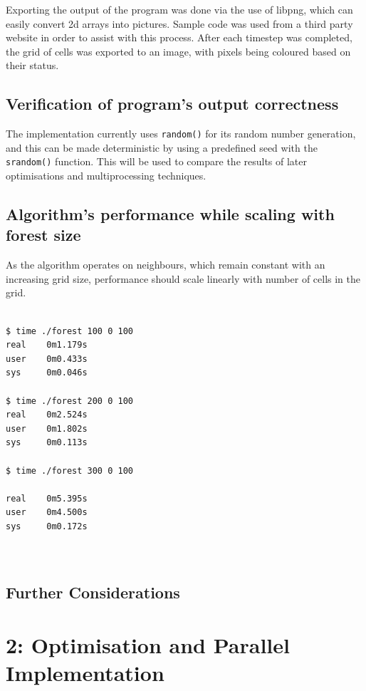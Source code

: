 \documentclass[11pt,a4paper]{report}
\begin{document}
Exporting the output of the program was done via the use of
libpng\cite{libpng}, which can easily convert 2d arrays into pictures. Sample
code was used from a third party website in order to assist with this
process\cite{png}. After each timestep was completed, the grid of cells was
exported to an image, with pixels being coloured based on their status.

\newpage
\section{Verification of program's output correctness}

The implementation currently uses \texttt{random()} for its random number
generation, and this can be made deterministic by using a predefined seed with
the \texttt{srandom()} function. This will be used to compare the results of
later optimisations and multiprocessing techniques.

\newpage
\section{Algorithm's performance while scaling with forest size}

As the algorithm operates on neighbours, which remain constant with an
increasing grid size, performance should scale linearly with number of cells in
the grid.

\begin{verbatim}

$ time ./forest 100 0 100
real    0m1.179s
user    0m0.433s
sys     0m0.046s

$ time ./forest 200 0 100
real    0m2.524s
user    0m1.802s
sys     0m0.113s

$ time ./forest 300 0 100

real    0m5.395s
user    0m4.500s
sys     0m0.172s



\end{verbatim}

\newpage
\section{Further Considerations}

\newpage

\chapter{2: Optimisation and Parallel Implementation}
\end{document}
